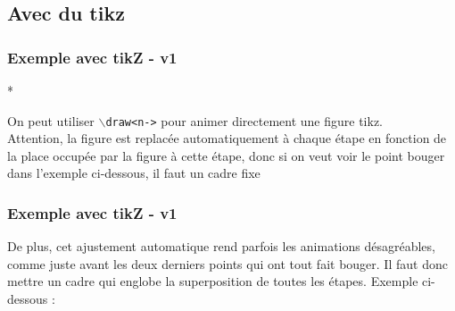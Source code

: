 \subsection{Avec du tikz}
\begin{frame} [fragile]
  \frametitle{Exemple avec tikZ - v1}*
  
  On peut utiliser  \texttt{$\backslash$draw<n->} pour animer directement
  une figure tikz.\\[0.2cm]
  \alert{Attention}, la figure est replacée automatiquement à chaque étape en fonction de la place occupée par la figure à cette étape, donc si on veut voir le point bouger dans l'exemple ci-dessous, il faut un cadre fixe
  \begin{center}
  \end{center}

\end{frame}

\begin{frame} [fragile]
  \frametitle{Exemple avec tikZ - v1}
  
  De plus, cet ajustement automatique rend parfois les animations désagréables,
  comme juste avant les deux derniers points qui ont tout fait bouger.
  Il faut donc mettre un cadre qui englobe la superposition de toutes les étapes.
  Exemple ci-dessous :
  \begin{center}
  \end{center}

\end{frame}
